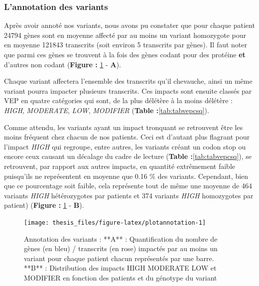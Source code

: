 \documentclass[12pt,twoside]{reedthesis}
\theoremstyle{definition}
\theoremstyle{definition}
\theoremstyle{remark}
\begin{document}
  \newpage
  
  \subsubsection{L'annotation des
  variants}\label{lannotation-des-variants-1}
  
  Après avoir annoté nos variants, nous avons pu constater que pour chaque
  patient 24794 gènes sont en moyenne affecté par au moins un variant
  homozygote pour en moyenne 121843 transcrits (soit environ 5 transcrits
  par gènes). Il faut noter que parmi ces gènes se trouvent à la fois des
  gènes codant pour des protéine \textbf{et} d'autres non codant
  (\textbf{Figure : }\ref{fig:plotannotation} - \textbf{A}).
  
  Chaque variant affectera l'ensemble des transcrits qu'il chevauche,
  ainsi un même variant pourra impacter plusieurs transcrits. Ces impacts
  sont ensuite classés par VEP en quatre catégories qui sont, de la plus
  délétère à la moins délétère : \emph{HIGH}, \emph{MODERATE}, \emph{LOW},
  \emph{MODIFIER} (\textbf{Table :}\ref{tab:tabvepcsq}).
  
  Comme attendu, les variants ayant un impact tronquant se retrouvent être
  les moins fréquent chez chacun de nos patients. Ceci est d'autant plus
  flagrant pour l'impact \emph{HIGH} qui regroupe, entre autres, les
  variants créant un codon stop ou encore ceux causant un décalage du
  cadre de lecture (\textbf{Table :}\ref{tab:tabvepcsq}), se retrouvent,
  par rapport aux autres impacts, en quantité extrêmement faible
  puisqu'ils ne représentent en moyenne que 0.16 \% des variants.
  Cependant, bien que ce pourcentage soit faible, cela représente tout de
  même une moyenne de 464 variants \emph{HIGH} hétérozygotes par patients
  et 374 variants \emph{HIGH} homozygotes par patient) (\textbf{Figure :
  }\ref{fig:plotannotation} - \textbf{B}).
  
  \newpage
  
  \begin{figure}
  
  {\centering \texttt{[image: thesis\_files/figure-latex/plotannotation-1]} 
  
  }
  
  \caption[Annotation des variants]{Annotation des variants : **A** : Quantification du nombre de gènes (en bleu) / transcrits (en rose) impactés par au moins un variant pour chaque patient chacun représentés par une barre. **B** : Distribution des impacts HIGH MODERATE LOW et MODIFIER en fonction des patients et du génotype du variant}\label{fig:plotannotation}
  \end{figure}
  
\end{document}
